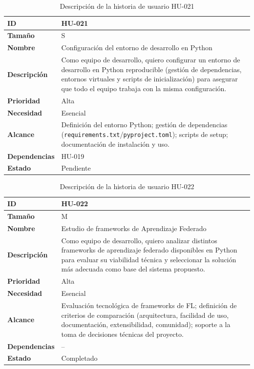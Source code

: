 \documentclass{report}
\begin{document}
\begin{table}[H]
\centering
\caption{Descripción de la historia de usuario HU-021}
\label{tab:hu021}
\begin{tabular}{|l|p{12cm}|}
\hline
\textbf{ID} & HU-021 \\ \hline
\textbf{Tamaño} & S \\ \hline
\textbf{Nombre} & Configuración del entorno de desarrollo en Python \\ \hline
\textbf{Descripción} &
Como equipo de desarrollo, quiero configurar un entorno de desarrollo en Python reproducible (gestión de dependencias, entornos virtuales y scripts de inicialización) para asegurar que todo el equipo trabaja con la misma configuración. \\ \hline
\textbf{Prioridad} & Alta \\ \hline
\textbf{Necesidad} & Esencial \\ \hline
\textbf{Alcance} &
Definición del entorno Python; gestión de dependencias (\texttt{requirements.txt}/\texttt{pyproject.toml}); scripts de setup; documentación de instalación y uso. \\ \hline
\textbf{Dependencias} & HU-019 \\ \hline
\textbf{Estado} & Pendiente \\ \hline
\end{tabular}
\end{table}



\begin{table}[H]
\centering
\caption{Descripción de la historia de usuario HU-022}
\label{tab:hu022}
\begin{tabular}{|l|p{12cm}|}
\hline
\textbf{ID} & HU-022 \\ \hline
\textbf{Tamaño} & M \\ \hline
\textbf{Nombre} & Estudio de frameworks de Aprendizaje Federado \\ \hline
\textbf{Descripción} &
Como equipo de desarrollo, quiero analizar distintos frameworks de aprendizaje federado disponibles en Python para evaluar su viabilidad técnica y seleccionar la solución más adecuada como base del sistema propuesto. \\ \hline
\textbf{Prioridad} & Alta \\ \hline
\textbf{Necesidad} & Esencial \\ \hline
\textbf{Alcance} &
Evaluación tecnológica de frameworks de FL; definición de criterios de comparación (arquitectura, facilidad de uso, documentación, extensibilidad, comunidad); soporte a la toma de decisiones técnicas del proyecto. \\ \hline
\textbf{Dependencias} & -- \\ \hline
\textbf{Estado} & Completado \\ \hline
\end{tabular}
\end{table}
\end{document}
